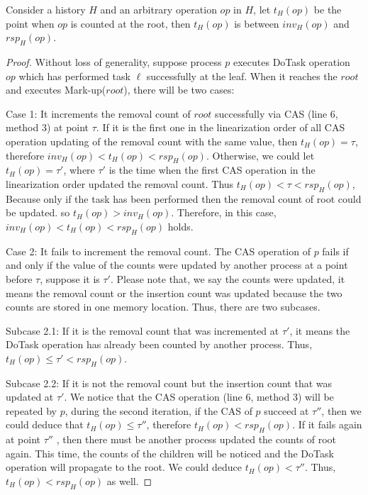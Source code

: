\begin{lem}
Consider a history $H$ and an arbitrary operation $op$ in $H$, let $t_H(op)$ be the point when $op$ is counted at the root, then $t_H(op)$ is between $inv_H(op)$ and $rsp_H(op)$.
\end{lem}
\begin{proof}
Without loss of generality, suppose process $p$ executes DoTask operation $op$ which has performed task $\ell$ successfully at the leaf. When it reaches the $root$ and executes Mark-up($root$), there will be two cases:

Case 1:  It increments the removal count of $root$ successfully via CAS (line 6, method 3) at point $\tau$. If it is the first one in the linearization order of all CAS operation updating of the removal count with the same value, then $t_H(op) = \tau$, therefore $inv_H(op) < t_H(op) < rsp_H(op)$. Otherwise, we could let $t_H(op) = \tau'$, where $\tau'$ is the time when the first CAS operation in the linearization order updated the removal count. Thus $t_H(op) < \tau < rsp_H(op)$, Because only if the task has been performed then the removal count of root could be updated. so $t_H(op) > inv_H(op)$. Therefore, in this case, $inv_H(op) < t_H(op) < rsp_H(op)$ holds.

Case 2: It fails to increment the removal count. The CAS operation of $p$ fails if and only if the value of the counts were updated by another process at a point before $\tau$, suppose it is $\tau'$. Please note that, we say the counts were updated, it means the removal count or the insertion count was updated because the two counts are stored in one memory location. Thus, there are two subcases.

Subcase 2.1: If it is the removal count that was incremented at $\tau'$, it means the DoTask operation has already been counted by another process. Thus, $t_H(op) \leq \tau' < rsp_H(op)$.

Subcase 2.2: If it is not the removal count but the insertion count that was updated at $\tau'$. We notice that the CAS operation (line 6, method 3) will be repeated by $p$, during the second iteration, if the CAS of $p$ succeed at $\tau''$, then we could deduce that $t_H(op) \leq \tau''$, therefore  $t_H(op) < rsp_H(op)$. If it fails again at point $\tau''$ , then there must be another process updated the counts of root again. This time, the counts of the children will be noticed and the DoTask operation will propagate to the root. We could deduce $t_H(op) < \tau''$. Thus,  $t_H(op) < rsp_H(op)$ as well.
\end{proof}

